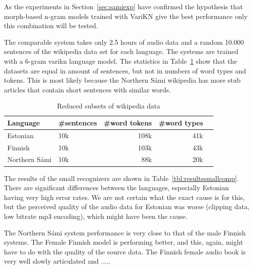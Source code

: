 \documentclass[b5paper]{article}
\newcommand{\ns}{{Northern Sámi }}
\begin{document}
As the experiments in Section~\ref{sec:samiexp} have confirmed the hypothesis that morph-based n-gram models trained with VariKN give the best performance only this combination will be tested.

The comparable system takes only 2.5 hours of audio data and a random 10.000 sentences of the wikipedia data set for each language. The systems are trained with a 6-gram varikn language model. The statistics in Table~\ref{tbl:lmdatacomp_small} show that the datasets are equal in amount of sentences, but not in numbers of word types and tokens. This is most likely because the \ns wikipedia has more stub articles that contain short sentences with similar words.


\begin{table}[!h]
\centering
\begin{tabular}{llrrr}
\textbf{Language} & \textbf{\#sentences} & \textbf{\#word tokens} & \textbf{\#word types}\\\hline
Estonian &   10k & 108k & 41k \\
 Finnish &   10k  & 103k & 43k \\
 \ns &  10k & 88k & 20k\\
\end{tabular}
\caption{Reduced subsets of wikipedia data\label{tbl:lmdatacomp_small}}
\end{table}

The results of the small recognizers are shown in Table~\ref{tbl:resultssmallcomp}. There are significant differences between the languages, especially Estonian having very high error rates. We are not certain what the exact cause is for this, but the perceived quality of the audio data for Estonian was worse (clipping data, low bitrate mp3 encoding), which might have been the cause.

The \ns system performance is very close to that of the male Finnish systems. The Female Finnish model is performing better, and this, again, might have to do with the quality of the source data. The Finnish female audio book is very well slowly articulated and .....
\end{document}
